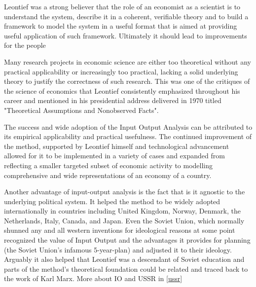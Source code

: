 \documentclass[12pt,a4paper]{scrartcl}
\begin{document}
	Leontief was a strong believer that the role of an economist as a scientist is to understand the system, describe it in a coherent, verifiable theory and to build a framework to model the system in a useful format that is aimed at providing useful application of such framework. Ultimately it should lead to improvements for the people 
	
	
	
	Many research projects in economic science are either too theoretical without any practical applicability or increasingly too practical, lacking a solid underlying theory to justify the correctness of such research. This was one of the critiques of the science of economics that Leontief consistently emphasized throughout his career and mentioned in his presidential address delivered in 1970 titled "Theoretical Assumptions and Nonobserved Facts". \cite[]{Leontief1971}
	
	The success and wide adoption of the Input Output Analysis can be attributed to its empirical applicability and practical usefulness. The continued improvement of the method, supported by Leontief himself and technological advancement allowed for it to be implemented in a variety of cases and expanded from reflecting a smaller targeted subset of economic activity to modelling comprehensive and wide representations of an economy of a country.	
	
	Another advantage of input-output analysis is the fact that is it agnostic to the underlying political system. It helped the method to be widely adopted internationally in countries including United Kingdom, Norway, Denmark, the Netherlands, Italy, Canada, and Japan. Even the Soviet Union, which normally shunned any and all western inventions for ideological reasons at some point recognized the value of Input Output and the advantages it provides for planning (the Soviet Union's infamous 5-year-plan) and adjusted it to their ideology. Arguably it also helped that Leontief was a descendant of Soviet education and parts of the method's theoretical foundation could be related and traced back to the work of Karl Marx. More about IO and USSR in \ref{ussr} \cite[p.297]{rose1995} 
	
\end{document}
